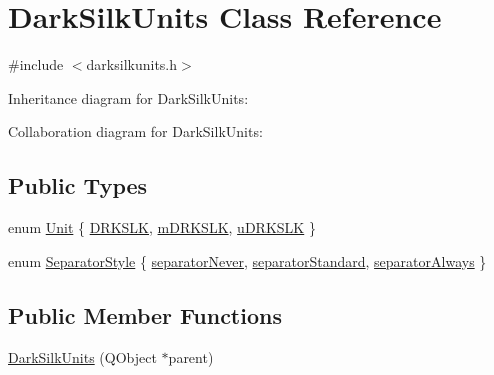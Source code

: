 \hypertarget{class_dark_silk_units}{}\section{Dark\+Silk\+Units Class Reference}
\label{class_dark_silk_units}


{\ttfamily \#include $<$darksilkunits.\+h$>$}



Inheritance diagram for Dark\+Silk\+Units\+:


Collaboration diagram for Dark\+Silk\+Units\+:
\subsection*{Public Types}
\begin{DoxyCompactItemize}
\item 
enum \hyperlink{class_dark_silk_units_a588cf5f654ad4aa646647ffde0031482}{Unit} \{ \hyperlink{class_dark_silk_units_a588cf5f654ad4aa646647ffde0031482a0edba4fddfbef1b8abc52ce9b516971d}{D\+R\+K\+S\+L\+K}, 
\hyperlink{class_dark_silk_units_a588cf5f654ad4aa646647ffde0031482a347ccbe3f707cc1e89bde2f248721a33}{m\+D\+R\+K\+S\+L\+K}, 
\hyperlink{class_dark_silk_units_a588cf5f654ad4aa646647ffde0031482a7bb3975d2da154400a8062a9bf620305}{u\+D\+R\+K\+S\+L\+K}
 \}
\item 
enum \hyperlink{class_dark_silk_units_a492e7b4a5708e04f3a97609c07b733b9}{Separator\+Style} \{ \hyperlink{class_dark_silk_units_a492e7b4a5708e04f3a97609c07b733b9a6f5caa3bdcef60e9ffccd7dd67a44697}{separator\+Never}, 
\hyperlink{class_dark_silk_units_a492e7b4a5708e04f3a97609c07b733b9a9cb3f6f5405413dc7960959c15cb5d6c}{separator\+Standard}, 
\hyperlink{class_dark_silk_units_a492e7b4a5708e04f3a97609c07b733b9acfe64621e0f82773983fa4d7b98496f2}{separator\+Always}
 \}
\end{DoxyCompactItemize}
\subsection*{Public Member Functions}
\begin{DoxyCompactItemize}
\item 
\hyperlink{class_dark_silk_units_a33ab49b1dfa2e509d005615832ec8eb0}{Dark\+Silk\+Units} (Q\+Object $\ast$parent)
\end{DoxyCompactItemize}
